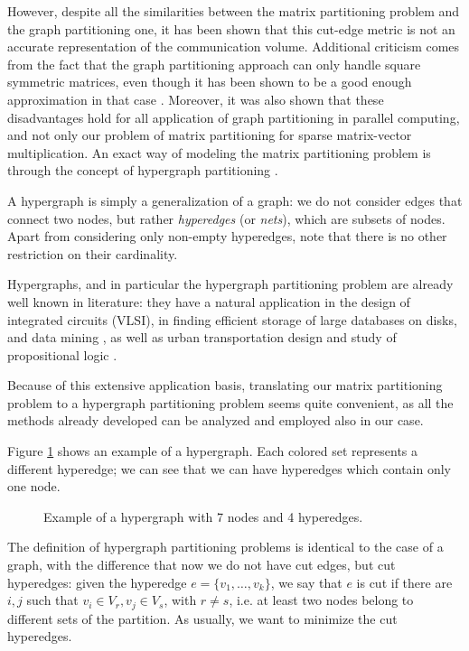 However, despite all the similarities between the matrix partitioning problem and the graph partitioning one, it has been shown \cite{hypergraph_model} that this cut-edge metric is not an accurate representation of the communication volume. Additional criticism \cite{hendrickson_emperor} comes from the fact that the graph partitioning approach can only handle square symmetric matrices, even though it has been shown to be a good enough approximation in that case \cite{zoltan_worth-it}. Moreover, it was also shown \cite{hendrickson_kolda} that these disadvantages hold for all application of graph partitioning in parallel computing, and not only our problem of matrix partitioning for sparse matrix-vector multiplication. An exact way of modeling the matrix partitioning problem is through the concept of hypergraph partitioning \cite{hypergraph_model}.

A hypergraph is simply a generalization of a graph: we do not consider edges that connect two nodes, but rather \emph{hyperedges} (or \emph{nets}), which are subsets of nodes. Apart from considering only non-empty hyperedges, note that there is no other restriction on their cardinality.

Hypergraphs, and in particular the hypergraph partitioning problem are already well known in literature: they have a natural application in the design of integrated circuits (VLSI), in finding efficient storage of large databases on disks, and data mining \cite{vlsi}, as well as urban transportation design and study of propositional logic \cite{papa_hypergraph}.

Because of this extensive application basis, translating our matrix partitioning problem to a hypergraph partitioning problem seems quite convenient, as all the methods already developed can be analyzed and employed also in our case.

Figure \ref{fig:hypergraph} shows an example of a hypergraph. Each colored set represents a different hyperedge; we can see that we can have hyperedges which contain only one node.

\begin{figure}[h]
	\centering
	\caption{Example of a hypergraph with 7 nodes and 4 hyperedges.}
	\label{fig:hypergraph}
\end{figure}

The definition of hypergraph partitioning problems is identical to the case of a graph, with the difference that now we do not have cut edges, but cut hyperedges: given the hyperedge $e=\{v_1,\dots,v_k\}$, we say that $e$ is cut if there are $i,j$ such that $v_i \in V_r, v_j \in V_s$, with $r \neq s$, i.e. at least two nodes belong to different sets of the partition. As usually, we want to minimize the cut hyperedges.


